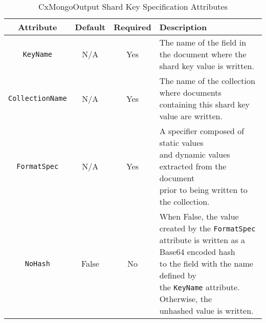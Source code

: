 \begin{table}[h]
    \caption{CxMongoOutput Shard Key Specification Attributes}        
    \begin{tabularx}{\textwidth}{cccl}
        \toprule
        \textbf{Attribute} & \textbf{Default} & \textbf{Required} & \textbf{Description}\\
        \midrule
        \texttt{KeyName} & N/A & Yes & \makecell[l]{The name of the field in the document where the\\shard key value is written.}\\
        \midrule
        \texttt{CollectionName} & N/A & Yes & \makecell[l]{The name of the collection where documents\\
        containing this shard key value are written.}\\
        \midrule
        \texttt{FormatSpec} & N/A & Yes & \makecell[l]{A specifier composed of static values\\
        and dynamic values extracted from the document\\
        prior to being written to the collection.}\\
        \midrule
        \texttt{NoHash} & False & No & \makecell[l]{When False, the value created by the \texttt{FormatSpec}\\
        attribute is written as a Base64 encoded hash\\
        to the field with the name defined by\\
        the \texttt{KeyName} attribute.  Otherwise, the\\
        unhashed value is written.}\\
        \bottomrule
    \end{tabularx}
\end{table}
